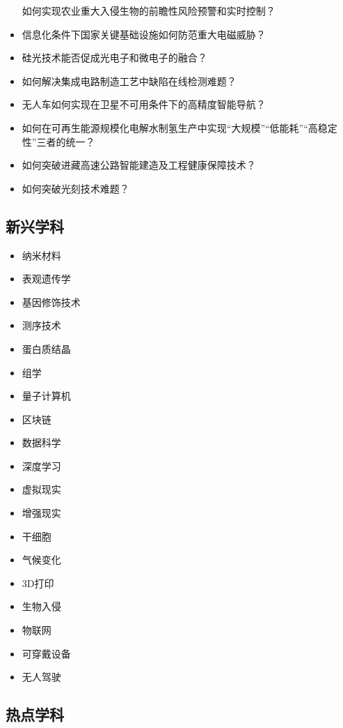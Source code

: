 \documentclass[]{tufte-book}
\providecommand{\tightlist}{%
  \setlength{\itemsep}{0pt}\setlength{\parskip}{0pt}}
\begin{document}
\begin{itemize}
  如何实现农业重大入侵生物的前瞻性风险预警和实时控制？
\item
  信息化条件下国家关键基础设施如何防范重大电磁威胁？
\item
  硅光技术能否促成光电子和微电子的融合？
\item
  如何解决集成电路制造工艺中缺陷在线检测难题？
\item
  无人车如何实现在卫星不可用条件下的高精度智能导航？
\item
  如何在可再生能源规模化电解水制氢生产中实现``大规模''``低能耗''``高稳定性''三者的统一？
\item
  如何突破进藏高速公路智能建造及工程健康保障技术？
\item
  如何突破光刻技术难题？
\end{itemize}

\hypertarget{ux65b0ux5174ux5b66ux79d1}{%
\subsection{新兴学科}\label{ux65b0ux5174ux5b66ux79d1}}

\begin{itemize}
\tightlist
\item
  纳米材料
\item
  表观遗传学
\item
  基因修饰技术
\item
  测序技术
\item
  蛋白质结晶
\item
  组学
\item
  量子计算机
\item
  区块链
\item
  数据科学
\item
  深度学习
\item
  虚拟现实
\item
  增强现实
\item
  干细胞
\item
  气候变化
\item
  3D打印
\item
  生物入侵
\item
  物联网
\item
  可穿戴设备
\item
  无人驾驶
\end{itemize}

\hypertarget{ux70edux70b9ux5b66ux79d1}{%
\subsection{热点学科}\label{ux70edux70b9ux5b66ux79d1}}
\end{document}
